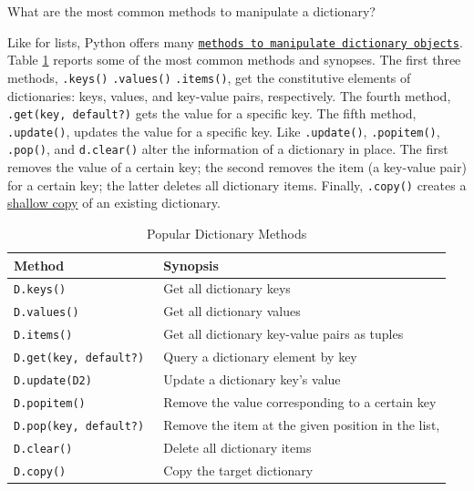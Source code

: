 \documentclass[a4paper,11pt]{book}
\newcommand{\question}[1]{%
    \begin{tcolorbox}[colback=comp_c!10,colframe=comp_c,sidebyside align=top,width=\linewidth,before skip=1ex]
        #1
    \end{tcolorbox}
    \switchcolumn%
}
\newcommand{\note}[1]{%
    \begin{tcolorbox}[colback=white!0,colframe=white!10,width=\linewidth,before skip=1ex]
        #1
    \end{tcolorbox}
}
\begin{document}
\begin{paracol}{2}
\question{\raggedright What are the most common methods to manipulate a dictionary?}
\note{Like for lists, Python offers many \href{https://docs.python.org/3/tutorial/datastructures.html\#dictionaries}{\texttt{methods to manipulate dictionary objects}}. Table \ref{tab:dictionary_methods} reports some of the most common methods and synopses. The first three methods, \texttt{.keys()} \texttt{.values()} \texttt{.items()}, get the constitutive elements of dictionaries: keys, values, and key-value pairs, respectively. The fourth method, \texttt{.get(key, default?)} gets the value for a specific key. The fifth method, \texttt{.update()}, updates the value for a specific key. Like \texttt{.update()}, \texttt{.popitem()}, \texttt{.pop()}, and \texttt{d.clear()} alter the information of a dictionary in place. The first removes the value of a certain key; the second removes the item (a key-value pair) for a certain key; the latter deletes all dictionary items. Finally, \texttt{.copy()} creates a \href{https://docs.python.org/3/library/copy.html}{shallow copy} of an existing dictionary.}
\end{paracol}

\begin{table}[!htbp]
	\caption{Popular Dictionary Methods}
	\label{tab:dictionary_methods}
	\centering
	\begin{tabular}{ll}
		\toprule \toprule
		Method & Synopsis \\
		\midrule 
		\texttt{D.keys()} & Get all dictionary keys\\
		\texttt{D.values()} & Get all dictionary values \\ 
		\texttt{D.items() } & Get all dictionary key-value pairs as tuples \\
		\texttt{D.get(key, default?)} & Query a dictionary element by key\\ 
		\texttt{D.update(D2) } & Update a dictionary key's value\\
		\texttt{D.popitem()} & Remove the value corresponding to a certain key \\ 
		\texttt{D.pop(key, default?) } & Remove the item at the given position in the list,\\
		\texttt{D.clear() } & Delete all dictionary items\\
		\texttt{D.copy() } & Copy the target dictionary \\
		\bottomrule 
	\end{tabular}
\end{table}
\end{document}

